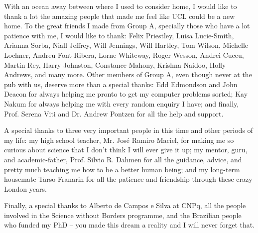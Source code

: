 \qquad With an ocean away between where I used to consider home, I would like to thank a lot the amazing people that made me feel like UCL could be a new home. To the great friends I made from Group A, specially those who have a lot patience with me, I would like to thank: Felix Priestley, Luisa Lucie-Smith, Arianna Sorba, Niall Jeffrey, Will Jennings, Will Hartley, Tom Wilson, Michelle Lochner, Andreu Font-Ribera, Lorne Whiteway, Roger Wesson, Andrei Cuceu, Martin Rey, Harry Johnston, Constance Mahony, Krishna Naidoo, Holly Andrews, and many more. Other members of Group A, even though never at the pub with us, deserve more than a special thanks: Edd Edmondson and John Deacon for always helping me pronto to get my computer problems sorted; Kay Nakum for always helping me with every random enquiry I have; and finally, Prof. Serena Viti and Dr. Andrew Pontzen for all the help and support. 

\qquad A special thanks to three very important people in this time and other periods of my life: my high school teacher, Mr. Jos\'e Ramiro Maciel, for making me so curious about science that I don't think I will ever give it up; my mentor, guru, and academic-father, Prof. Silvio R. Dahmen for all the guidance, advice, and pretty much teaching me how to be a better human being; and my long-term housemate Tarso Franarin for all the patience and friendship through these crazy London years.

\qquad Finally, a special thanks to Alberto de Campos e Silva at CNPq, all the people involved in the Science without Borders programme, and the Brazilian people who funded my PhD -- you made this dream a reality and I will never forget that.